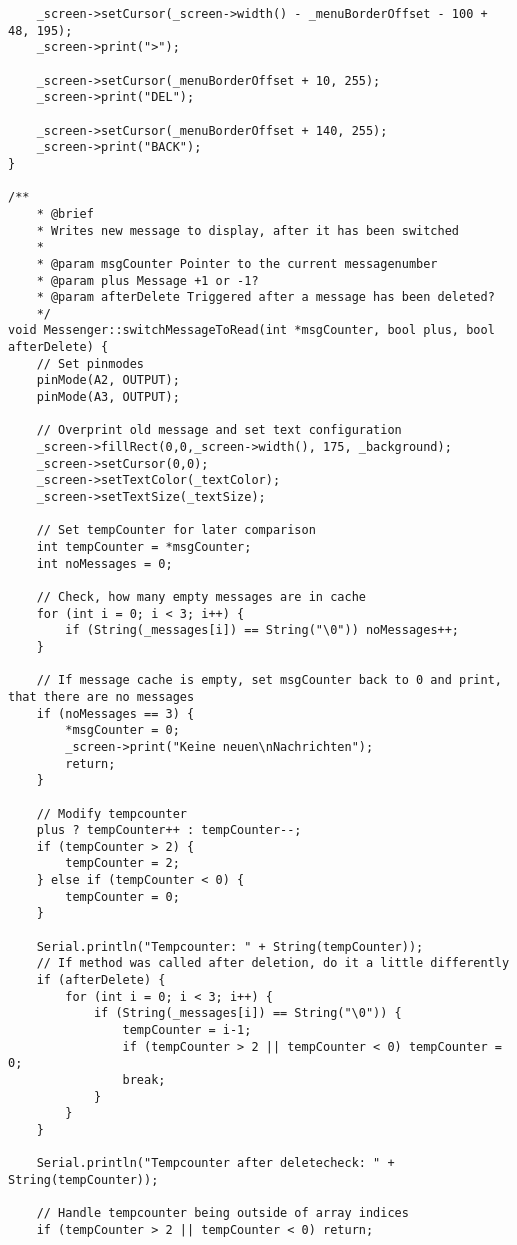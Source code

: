 \documentclass[a4paper, 11pt]{scrartcl}
\begin{document}
\begin{lstlisting}
    _screen->setCursor(_screen->width() - _menuBorderOffset - 100 + 48, 195);
    _screen->print(">");

    _screen->setCursor(_menuBorderOffset + 10, 255);
    _screen->print("DEL");

    _screen->setCursor(_menuBorderOffset + 140, 255);
    _screen->print("BACK");
}

/**
    * @brief 
    * Writes new message to display, after it has been switched
    * 
    * @param msgCounter Pointer to the current messagenumber
    * @param plus Message +1 or -1?
    * @param afterDelete Triggered after a message has been deleted?
    */
void Messenger::switchMessageToRead(int *msgCounter, bool plus, bool afterDelete) {
    // Set pinmodes
    pinMode(A2, OUTPUT);
    pinMode(A3, OUTPUT);

    // Overprint old message and set text configuration
    _screen->fillRect(0,0,_screen->width(), 175, _background);
    _screen->setCursor(0,0);
    _screen->setTextColor(_textColor);
    _screen->setTextSize(_textSize);

    // Set tempCounter for later comparison
    int tempCounter = *msgCounter;
    int noMessages = 0;

    // Check, how many empty messages are in cache
    for (int i = 0; i < 3; i++) {
        if (String(_messages[i]) == String("\0")) noMessages++;
    }

    // If message cache is empty, set msgCounter back to 0 and print, that there are no messages
    if (noMessages == 3) {
        *msgCounter = 0;
        _screen->print("Keine neuen\nNachrichten");
        return;
    }

    // Modify tempcounter
    plus ? tempCounter++ : tempCounter--;
    if (tempCounter > 2) {
        tempCounter = 2;
    } else if (tempCounter < 0) {
        tempCounter = 0;
    }

    Serial.println("Tempcounter: " + String(tempCounter));
    // If method was called after deletion, do it a little differently
    if (afterDelete) {
        for (int i = 0; i < 3; i++) {
            if (String(_messages[i]) == String("\0")) {
                tempCounter = i-1; 
                if (tempCounter > 2 || tempCounter < 0) tempCounter = 0;
                break; 
            }
        }
    }

    Serial.println("Tempcounter after deletecheck: " + String(tempCounter));

    // Handle tempcounter being outside of array indices
    if (tempCounter > 2 || tempCounter < 0) return;


\end{lstlisting}
\end{document}
